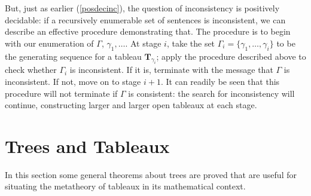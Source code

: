 But, just as earlier (\autoref{posdecinc}), the question of inconsistency is positively decidable: if a recursively enumerable set of sentences is inconsistent, we can describe an effective procedure demonstrating that. The procedure is to begin with our enumeration of $\Gamma$, $\gamma_{1},…$. At stage $i$, take the set $\Gamma_{i} = \{ \gamma_{1},…,\gamma_{i}\}$ to be the generating sequence for a tableau $\mathbf{T}_{\gamma_{i}}$; apply the procedure described above to check whether $\Gamma_{i}$ is inconsistent. If it is, terminate with the message that $\Gamma$ is inconsistent. If not, move on to stage $i+1$. It can readily be seen that this procedure will not terminate if $\Gamma$ is consistent: the search for inconsistency will continue, constructing larger and larger open tableaux at each stage.








\section{Trees and Tableaux}

In this section some general theorems about trees are proved that are useful for situating the metatheory of tableaux in its mathematical context.

